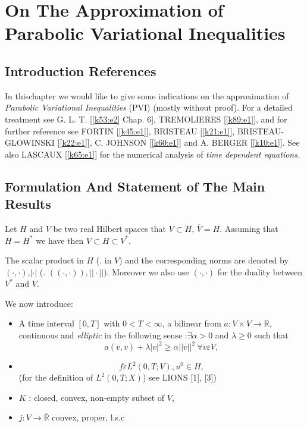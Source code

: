 
\chapter{On The Approximation of Parabolic  Variational
  Inequalities}\label{chap3} 

\section{Introduction  References}\label{c3:s1}

In this\pageoriginale  chapter we would like to give some indications
on the approximation of \textit{Parabolic Variational Inequalities}
(PVI) (mostly without proof). For a detailed treatment see
G. L. T. [\ref{k53:e2} 
  Chap. 6],  TREMOLIERES [\ref{k89:e1}], and for further reference see FORTIN
[\ref{k45:e1}], BRISTEAU [\ref{k21:e1}], BRISTEAU-GLOWINSKI
[\ref{k22:e1}], C. JOHNSON [\ref{k60:e1}] and
A. BERGER [\ref{k10:e1}]. See also LASCAUX [\ref{k65:e1}] for the
numerical analysis of \textit{time dependent equations.}  

\section{Formulation And Statement of The Main Results}\label{c3:s2}

Let $H$ and $V$ be two real Hilbert spaces that  $V \subset H$, $\overline{V} = H$. Assuming that $H = H^*$  we have then $V \subset H \subset V^*$.

The scalar product in $H$ (\resp. in $V$) and the corresponding norms
are denoted by $(\cdot, \cdot)$,$|\cdot|$  (\resp. $((\cdot , \cdot)),
|| \cdot||)$. Moreover we also use $(\cdot , \cdot)$ for the duality
between $V^*$ and $V$. 

We now introduce:
\begin{itemize}
\item A time interval $[0,T]$ with $0 < T <\infty$, a bilinear from $a
  : V \times V \to \mathbb{R}$, continuous and \textit{elliptic} in
  the following sense :$\exists \alpha> 0$ and $\lambda \geq 0$ such
  that 
$$
a (v, v) + \lambda |v|^2 \geq \alpha || v||^2 \ \forall v \varepsilon V,
$$
\item 
$$
f \varepsilon L^2 (0, T ; V), u^0 \in H,
$$
(for the definition of $L^2 (0, T; X)$) see LIONS [1], [3])
\item $K$ : closed, convex, non-empty subset of $V$,
\item $j : V \to \overline{\mathbb{R}}$ convex, proper, l.s.c
\end{itemize}

